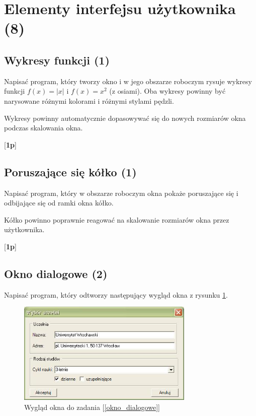 ﻿\section{Elementy interfejsu użytkownika (8)}

\subsection{Wykresy funkcji (1)} 

      Napisać program, który tworzy okno i w jego obszarze roboczym rysuje wykresy funkcji $f(x) = |x|$ i 
\label{wykres_z_osiami}	  
      $f(x) = x^2$ (z osiami). Oba wykresy powinny być narysowane różnymi kolorami i różnymi stylami pędzli.
      
      Wykresy powinny automatycznie dopasowywać się do nowych rozmiarów okna podczas skalowania okna.
      
      [{\bf 1p}]

\subsection{Poruszające się kółko (1)} 

      Napisać program, który w obszarze roboczym okna pokaże poruszające się i odbijające się od ramki okna kółko. 
\label{poruszajace_kolko}
      
      Kółko powinno poprawnie reagować na skalowanie rozmiarów okna przez użytkownika.
      
      [{\bf 1p}]

\subsection{Okno dialogowe (2)} 
      
      Napisać program, który odtworzy następujący wygląd okna z rysunku \ref{r1}.
\label{okno_dialogowe}

	\begin{figure}
	\begin{center}
	\includegraphics[width=0.75\textwidth]{z1_01}
	\end{center}
	\caption{Wygląd okna do zadania [\ref{okno_dialogowe}]}
	\label{r1}
	\end{figure}

